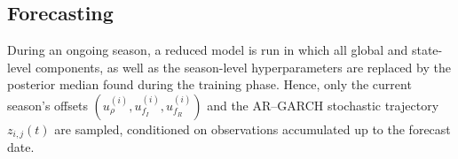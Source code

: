 \documentclass[11pt]{article}
\begin{document}
\subsection*{Forecasting}
 
During an ongoing season, a reduced model is run in which all global and state-level components, as well as the season-level hyperparameters are replaced by the posterior median found during the training phase. Hence, only the current season's offsets $(u^{(i)}_\rho, u^{(i)}_{f_I}, u^{(i)}_{f_R})$ and the AR--GARCH stochastic trajectory $z_{i,j}(t)$ are sampled, conditioned on observations accumulated up to the forecast date.\\



\end{document}
